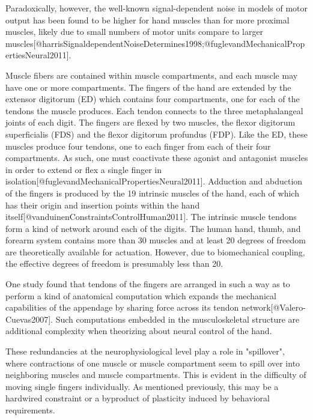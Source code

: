 \documentclass[../main.tex]{subfiles}
\begin{document}
Paradoxically, however, the well-known signal-dependent noise in models of motor output has been found to be higher for hand muscles than for more proximal muscles, likely due to small numbers of motor units compare to larger muscles[@harrisSignaldependentNoiseDetermines1998;@fuglevandMechanicalPropertiesNeural2011]. 

Muscle fibers are contained within muscle compartments, and each muscle may have one or more compartments. The fingers of the hand are extended by the extensor digitorum (ED) which contains four compartments, one for each of the tendons the muscle produces. Each tendon connects to the three metaphalangeal joints of each digit. The fingers are flexed by two muscles, the flexor digitorum superficialis (FDS) and the flexor digitorum profundus (FDP). Like the ED, these muscles produce four tendons, one to each finger from each of their four compartments. As such, one must coactivate these agonist and antagonist muscles in order to extend or flex a single finger in isolation[@fuglevandMechanicalPropertiesNeural2011]. Adduction and abduction of the fingers is produced by the 19 intrinsic muscles of the hand, each of which has their origin and insertion points within the hand itself[@vanduinenConstraintsControlHuman2011]. The intrinsic muscle tendons form a kind of network around each of the digits. The human hand, thumb, and forearm system contains more than 30 muscles and at least 20 degrees of freedom are theoretically available for actuation. However, due to biomechanical coupling, the effective degrees of freedom is presumably less than 20.

One study found that tendons of the fingers are arranged in such a way as to perform a kind of anatomical computation which expands the mechanical capabilities of the appendage by sharing force across its tendon network[@Valero-Cuevas2007]. Such computations embedded in the musculoskeletal structure are additional complexity when theorizing about neural control of the hand. 


These redundancies at the neurophysiological level play a role in "spillover", where contractions of one muscle or muscle compartment seem to spill over into neighboring muscles and muscle compartments. This is evident in the difficulty of moving single fingers individually. As mentioned previously, this may be a hardwired constraint or a byproduct of plasticity induced by behavioral requirements. 
\end{document}
